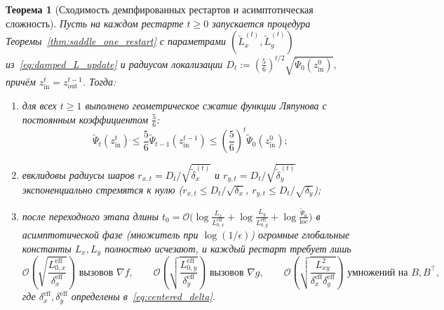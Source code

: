 \documentclass[11pt, a4paper]{article}
\newtheorem{theorem}{Теорема}[section]
\theoremstyle{definition}
\begin{document}
\begin{theorem}[Сходимость демпфированных рестартов и асимптотическая сложность]\label{thm:damped_restarts}
Пусть на каждом рестарте $t \ge 0$ запускается процедура Теоремы~\ref{thm:saddle_one_restart} с параметрами $(\widetilde{L}_x^{(t)}, \widetilde{L}_y^{(t)})$ из~\eqref{eq:damped_L_update} и радиусом локализации $D_t := \left(\frac{5}{6}\right)^{t/2} \sqrt{\widetilde{\Psi}_0(z_{\mathrm{in}}^0)}$, причём $z_{\mathrm{in}}^t = z_{\mathrm{out}}^{t-1}$. Тогда:
\begin{enumerate}
    \item для всех $t \ge 1$ выполнено геометрическое сжатие функции Ляпунова с постоянным коэффициентом $\frac{5}{6}$:
    \begin{equation}\label{eq:psi_5_6}
    \widetilde{\Psi}_t(z_{\mathrm{in}}^t) \le \frac{5}{6} \widetilde{\Psi}_{t-1}(z_{\mathrm{in}}^{t-1}) \le \left(\frac{5}{6}\right)^t \widetilde{\Psi}_0(z_{\mathrm{in}}^0);
    \end{equation}
    \item евклидовы радиусы шаров $r_{x,t} = D_t/\sqrt{\widetilde{\delta}_x^{(t)}}$ и $r_{y,t} = D_t/\sqrt{\widetilde{\delta}_y^{(t)}}$ экспоненциально стремятся к нулю ($r_{x,t} \le D_t/\sqrt{\delta_x}$, $r_{y,t} \le D_t/\sqrt{\delta_y}$);
    \item после переходного этапа длины $t_0 = \mathcal{O}\big(\log\frac{L_x}{L_{0,x}^{\mathrm{eff}}} + \log\frac{L_y}{L_{0,y}^{\mathrm{eff}}} + \log\frac{\widetilde{\Psi}_0}{\text{loc}}\big)$ в асимптотической фазе (множитель при $\log(1/\epsilon)$) огромные глобальные константы $L_x, L_y$ полностью исчезают, и каждый рестарт требует лишь
    \begin{equation}\label{eq:saddle_asymptotic_complexity}
    \mathcal{O}\!\left(\sqrt{\frac{L_{0,x}^{\mathrm{eff}}}{\delta_x^{\mathrm{eff}}}}\right) \text{ вызовов } \nabla f, \qquad \mathcal{O}\!\left(\sqrt{\frac{L_{0,y}^{\mathrm{eff}}}{\delta_y^{\mathrm{eff}}}}\right) \text{ вызовов } \nabla g, \qquad \mathcal{O}\!\left(\sqrt{\frac{L_{xy}^2}{\delta_x^{\mathrm{eff}}\delta_y^{\mathrm{eff}}}}\right) \text{ умножений на } B, B^\top,
    \end{equation}
    где $\delta_x^{\mathrm{eff}}, \delta_y^{\mathrm{eff}}$ определены в~\eqref{eq:centered_delta}.
\end{enumerate}
\end{theorem}
\end{document}
